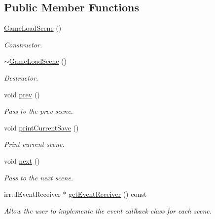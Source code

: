 \subsection*{Public Member Functions}
\begin{DoxyCompactItemize}
\item 
\hyperlink{classGameLoadScene_a225786d3826577aa3743164b6262dc2b}{Game\+Load\+Scene} ()
\begin{DoxyCompactList}\small\item\em Constructor. \end{DoxyCompactList}\item 
\hyperlink{classGameLoadScene_a39c0f378455520c08d21e0642f35cd9b}{$\sim$\+Game\+Load\+Scene} ()
\begin{DoxyCompactList}\small\item\em Destructor. \end{DoxyCompactList}\item 
\mbox{\label{classGameLoadScene_a4d2c3a0455cd070671dbef281b7bd87f}} 
void \hyperlink{classGameLoadScene_a4d2c3a0455cd070671dbef281b7bd87f}{prev} ()
\begin{DoxyCompactList}\small\item\em Pass to the prev scene. \end{DoxyCompactList}\item 
\mbox{\label{classGameLoadScene_a67796257e428031f44010b9bf0b3173a}} 
void \hyperlink{classGameLoadScene_a67796257e428031f44010b9bf0b3173a}{print\+Current\+Save} ()
\begin{DoxyCompactList}\small\item\em Print current scene. \end{DoxyCompactList}\item 
\mbox{\label{classGameLoadScene_aa00e2695ad042ee9a637ab0d5c08b054}} 
void \hyperlink{classGameLoadScene_aa00e2695ad042ee9a637ab0d5c08b054}{next} ()
\begin{DoxyCompactList}\small\item\em Pass to the next scene. \end{DoxyCompactList}\item 
irr\+::\+I\+Event\+Receiver $\ast$ \hyperlink{classGameLoadScene_a81807790ad65bd2cf97a1e543cae2b74}{get\+Event\+Receiver} () const
\begin{DoxyCompactList}\small\item\em Allow the user to implemente the event callback class for each scene. \end{DoxyCompactList}\end{DoxyCompactItemize}


